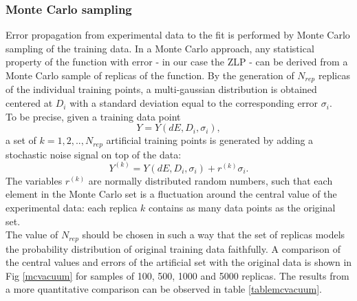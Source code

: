 \documentclass[11pt,a4paper]{article}
\numberwithin{equation}{section}
\numberwithin{figure}{section}
\numberwithin{table}{section}
\begin{document}
\subsubsection*{Monte Carlo sampling}
Error propagation from experimental data to the fit is performed by Monte Carlo sampling of the training data. In a Monte Carlo approach, any statistical property of the function with error - in our case the ZLP - can be derived from a Monte Carlo sample of replicas of the function. By the generation of $N_{rep}$ replicas of the individual training points, a multi-gaussian distribution is obtained centered at $D_i$ with a standard deviation equal to the corresponding error $\sigma_i$. \\
To be precise, given a training data point
\begin{equation}
    Y = Y(dE, D_i,\sigma_i), 
\end{equation} a set of $k= 1,2,..,N_{rep}$ artificial training points is generated by adding a stochastic noise signal on top of the data: 
\begin{equation}
    Y^{(k)} = Y(dE, D_i,\sigma_i) + r^{(k)}\sigma_i.
\end{equation}
The variables $r^{(k)}$ are normally distributed random numbers, such that each element in the Monte Carlo set is a fluctuation around the central value of the experimental data: each replica $k$ contains as many data points as the original set. \\

The value of $N_{rep}$ should be chosen in such a way that the set of replicas models the probability distribution of original training data faithfully. A comparison of the central values and errors of the artificial set with the original data is shown in Fig \ref{mcvacuum} for samples of 100, 500, 1000 and 5000 replicas. The results from a more quantitative comparison can be observed in table \ref{tablemcvacuum}.
\end{document}
